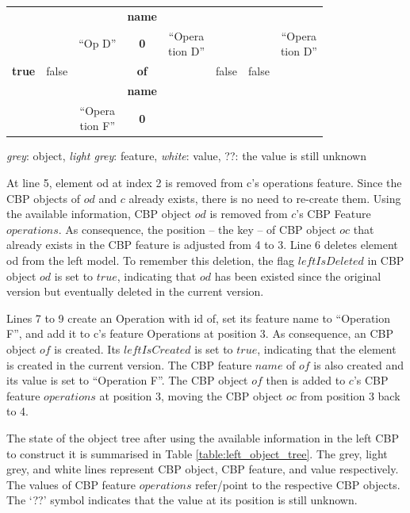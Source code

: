 \documentclass{llncs}
\begin{document}
\begin{table}
\begin{footnotesize}
\begin{tabular}{  c  c  c  c  c  c  c  c  }
            \rowcolor{gray2}
            & & & \textbf{\textsf{name}} & & & & \\
            & & ``Op D'' & \textbf{0} & \makecell{``Opera\\tion D''} & & & \makecell{``Opera\\tion D''} \\
            \hline
            \rowcolor{gray1}
            \textbf{true} & false & & \textbf{\textsf{of}} & & false & false & \\
            \rowcolor{gray2}
            & & & \textbf{\textsf{name}} & & & & \\
            & & \makecell{``Opera\\tion F''} & \textbf{0} & & & &  \\
            \hline
        \end{tabular}
        \begin{flushright}
            \textit{grey}: object, \textit{light grey}: feature, \textit{white}: value, ??: the value is still unknown
        \end{flushright}
    \end{footnotesize}
\end{table}

At line 5, element \textsf{od} at index 2 is removed from \textsf{c}'s \textsf{operations} feature. Since the CBP objects of $od$ and $c$ already exists, there is no need to re-create them. Using the available information, CBP object $od$ is removed from $c$'s CBP Feature $operations$. As consequence, the position -- the key -- of CBP object $oc$ that already exists in the CBP feature is adjusted from 4 to 3. Line 6 deletes element \textsf{od} from the left model. To remember this deletion, the flag $leftIsDeleted$ in CBP object $od$ is set to $true$, indicating that $od$ has been existed since the original version but eventually deleted in the current version. 

Lines 7 to 9 create an \textsf{Operation} with id \textsf{of}, set its feature \textsf{name} to ``Operation F'', and add it to \textsf{c}'s feature \textsf{Operations} at position 3. As consequence, an CBP object $of$ is created. Its $leftIsCreated$ is set to $true$, indicating that the element is created in the current version. The CBP feature $name$ of $of$ is also created and its value is set to ``Operation F''. The CBP object $of$ then is added to $c$'s CBP feature $operations$ at position 3, moving the CBP object $oc$ from position 3 back to 4. 

The state of the object tree after using the available information in the left CBP to construct it is summarised in Table \ref{table:left_object_tree}. The grey, light grey, and white lines represent CBP object, CBP feature, and value respectively. The values of CBP feature $operations$ refer/point to the respective CBP objects. The `??' symbol indicates that the value at its position is still unknown.
\end{document}
